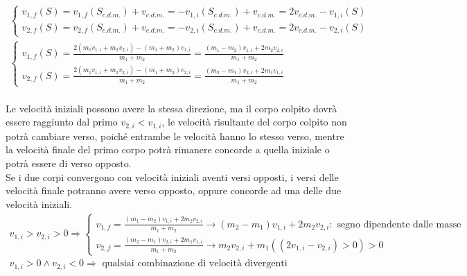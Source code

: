\documentclass{article}
\numberwithin{equation}{subsection}
\begin{document}
\begin{gather}
    \begin{cases}
        v_{1,f}(S)=v_{1,f}(S_{c.d.m.})+v_{c.d.m.}=-v_{1,i}(S_{c.d.m.})+v_{c.d.m.}=2v_{c.d.m.}-v_{1,i}(S)\\
        v_{2,f}(S)=v_{2,f}(S_{c.d.m.})+v_{c.d.m.}=-v_{2,i}(S_{c.d.m.})+v_{c.d.m.}=2v_{c.d.m.}-v_{2,i}(S)
    \end{cases}\\
    \begin{cases}
        v_{1,f}(S)=\displaystyle\frac{2(m_1v_{1,i}+m_2v_{2,i})-(m_1+m_2)v_{1,i}}{m_1+m_2}=\frac{(m_1-m_2)v_{1,i}+2m_2v_{2,i}}{m_1+m_2}\\
        v_{2,f}(S)=\displaystyle\frac{2(m_1v_{1,i}+m_2v_{2,i})-(m_1+m_2)v_{2,i}}{m_1+m_2}=\frac{(m_2-m_1)v_{2,i}+2m_1v_{1,i}}{m_1+m_2}
    \end{cases}
\end{gather}\\
Le velocità iniziali possono avere la stessa direzione, ma il 
corpo colpito dovrà essere raggiunto dal primo $v_{2,i}<v_{1,i}$, 
le velocità risultante del corpo colpito non potrà cambiare 
verso, poiché entrambe le velocità hanno lo stesso verso, mentre 
la velocità finale del primo corpo potrà rimanere concorde a 
quella iniziale o potrà essere di verso opposto.\\
Se i due corpi convergono con velocità iniziali aventi 
versi opposti, i versi delle velocità finale potranno avere 
verso opposto, oppure concorde ad una delle due velocità iniziali.
\begin{gather}
    v_{1,i}>v_{2,i}>0\Rightarrow
    \begin{cases}
        \displaystyle v_{1,f}=\frac{(m_1-m_2)v_{1,i}+2m_2v_{2,i}}{m_1+m_2}\rightarrow (m_2-m_1)v_{1,i}+2m_2v_{2,i}:\mbox{ segno dipendente dalle masse}\\
        \displaystyle v_{2,f}=\frac{(m_2-m_1)v_{2,i}+2m_1v_{1,i}}{m_1+m_2}\rightarrow  m_2v_{2,i}+m_1((2v_{1,i}-v_{2,i})>0)>0
    \end{cases}\\
    v_{1,i}>0\land v_{2,i}<0\Rightarrow\mbox{ qualsiai combinazione di velocità divergenti}
\end{gather}
\end{document}
